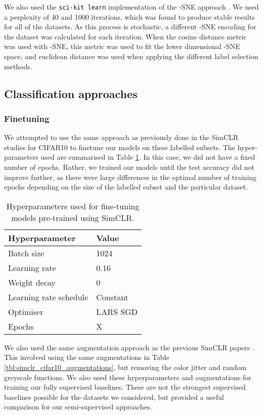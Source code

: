 \documentclass{article}
\begin{document}
We also used the \texttt{sci-kit learn} implementation of the -SNE approach \citep{scikit-learn}. We used a perplexity of 40 and 1000 iterations, which was found to produce stable results for all of the datasets. As this process is stochastic, a different -SNE encoding for the dataset was calculated for each iteration. When the cosine distance metric was used with -SNE, this metric was used to fit the lower dimensional -SNE space, and euclidean distance was used when applying the different label selection methods.

\subsection{Classification approaches}
\label{sec:appendix_classification_approaches}
\subsubsection{Finetuning}

We attempted to use the same approach as previously done in the SimCLR studies \citep{chen2020simple, chen2020big} for CIFAR10 to finetune our models on these labelled subsets. The hyper-parameters used are summarised in Table \ref{tbl:finetuning_cifar10_hyperparameters}. In this case, we did not have a fixed number of epochs. Rather, we trained our models until the test accuracy did not improve further, as there were large differences in the optimal number of training epochs depending on the size of the labelled subset and the particular dataset.

\begin{table}[H]
\centering
\caption{Hyperparameters used for fine-tuning models pre-trained using SimCLR.}
\label{tbl:finetuning_cifar10_hyperparameters}
 \begin{tabular}{m{6cm}  m{6cm}} 
 \hline
 Hyperparameter & Value \\
 \hline
 Batch size & 1024 \\
 Learning rate & 0.16 \\ 
 Weight decay & 0 \\
 Learning rate schedule &  Constant \\
 Optimiser & LARS SGD \\
 Epochs & X \\
 \hline
 \end{tabular}
\end{table}

We also used the same augmentation approach as the previous SimCLR papers \citep{chen2020simple, chen2020big}. This involved using the same augmentations in Table \ref{tbl:simclr_cifar10_augmentations}, but removing the color jitter and random greyscale functions. We also used these hyperparameters and augmentations for training our fully supervised baselines. These are not the strongest supervised baselines possible for the datasets we considered, but provided a useful comparison for our semi-supervised approaches.
\end{document}

